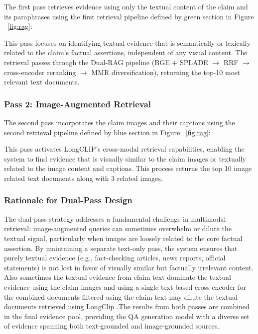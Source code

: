 The first pass retrieves evidence using only the textual content of the claim and its paraphrases using the first retrieval pipeline defined by green section in Figure ~\ref{fig:rag}:

This pass focuses on identifying textual evidence that is semantically or lexically related to the claim's factual assertions, independent of any visual content. The retrieval passes through the Dual-RAG pipeline (BGE + SPLADE $\rightarrow$ RRF $\rightarrow$ cross-encoder reranking $\rightarrow$ MMR diversification), returning the top-10 most relevant text documents.

\subsubsection{Pass 2: Image-Augmented Retrieval}

The second pass incorporates the claim images and their captions using the second retrieval pipeline defined by blue section in Figure ~\ref{fig:rag}:

This pass activates LongCLIP's cross-modal retrieval capabilities, enabling the system to find evidence that is visually similar to the claim images or textually related to the image content and captions. This process returns the top 10 image related text documents along with 3 related images.

\subsubsection{Rationale for Dual-Pass Design}

The dual-pass strategy addresses a fundamental challenge in multimodal retrieval: image-augmented queries can sometimes overwhelm or dilute the textual signal, particularly when images are loosely related to the core factual assertion. By maintaining a separate text-only pass, the system ensures that purely textual evidence (e.g., fact-checking articles, news reports, official statements) is not lost in favor of visually similar but factually irrelevant content. Also sometimes the textual evidence from claim text dominate the textual evidence using the claim images and using a single text based cross encoder for the combined documents filtered using the claim text may dilute the textual documents retrieved using LongClip .The results from both passes are combined in the final evidence pool, providing the QA generation model with a diverse set of evidence spanning both text-grounded and image-grounded sources.

